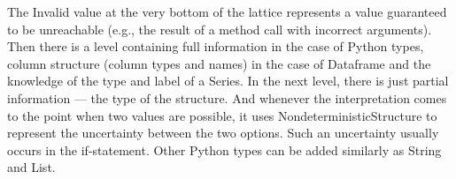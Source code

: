 The Invalid value at the very bottom of the lattice represents a value guaranteed to be unreachable
(e.g., the result of a method call with incorrect arguments).
Then there is a level containing full information in the case of Python types, column structure (column types and names)
in the case of Dataframe and the knowledge of the type and label of a Series.
In the next level, there is just partial information --- the type of the structure.
And whenever the interpretation comes to the point when two values are possible, it uses NondeterministicStructure
to represent the uncertainty between the two options.
Such an uncertainty usually occurs in the if-statement.
Other Python types can be added similarly as String and List.